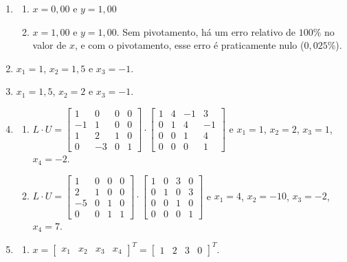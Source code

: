 \documentclass[12pt,a4paper]{article}
\begin{document}
\begin{enumerate}
\item \begin{enumerate}
\item $x = 0,00$ e $y = 1,00$
\item $x = 1,00$ e $y = 1,00$. Sem pivotamento, há um erro relativo de $100\%$ no valor de $x$, e com o pivotamento, esse erro é praticamente nulo ($0,\!025\%$).
\end{enumerate}
\item $x_1 = 1$, $x_2 = 1,\!5$ e $x_3 = -1$.
\item $x_1 = 1,\!5$, $x_2 = 2$ e $x_3 = -1$.
\item \begin{enumerate}
\item $L \cdot U =
\begin{bmatrix}
 1 &  0 & 0 & 0 \\
-1 &  1 & 0 & 0 \\
 1 &  2 & 1 & 0 \\
 0 & -3 & 0 & 1
\end{bmatrix}
\cdot
\begin{bmatrix}
 1 & 4 & -1 &  3 \\
 0 & 1 &  4 & -1 \\
 0 & 0 &  1 &  4 \\
 0 & 0 &  0 &  1
\end{bmatrix}$ e $x_1 = 1$, $x_2 = 2$, $x_3 = 1$, $x_4 = -2$.
\item $L \cdot U =
\begin{bmatrix}
 1 &  0 & 0 & 0 \\
 2 &  1 & 0 & 0 \\
-5 &  0 & 1 & 0 \\
 0 &  0 & 1 & 1
\end{bmatrix}
\cdot
\begin{bmatrix}
 1 & 0 &  3 &  0 \\
 0 & 1 &  0 &  3 \\
 0 & 0 &  1 &  0 \\
 0 & 0 &  0 &  1
\end{bmatrix}$ e $x_1 = 4$, $x_2 = -10$, $x_3 = -2$, $x_4 = 7$.
\end{enumerate}
\item \begin{enumerate}
\item $ x = \begin{bmatrix}
x_1 & x_2 & x_3 & x_4
\end{bmatrix}^T = \begin{bmatrix}
1 & 2 & 3 & 0
\end{bmatrix}^T$.

\end{enumerate}
\end{enumerate}
\end{document}

